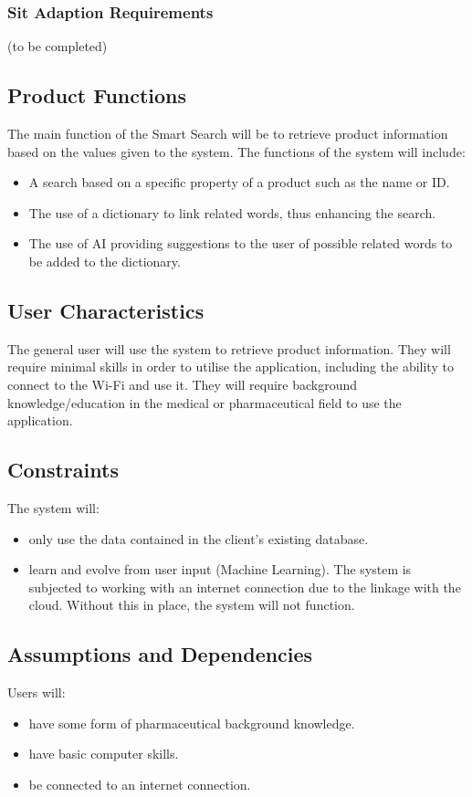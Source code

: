 \documentclass[a4paper,10pt]{article}
\begin{document}
           \subsubsection{Sit Adaption Requirements}
        (to be completed)

		\subsection{Product Functions} {The main function of the Smart Search will be to retrieve product information based on the values given to the system. The functions of the system will include:  }
	\begin{itemize}
  		\item A search based on a specific property of a product such as the name or ID.
		\item The use of a dictionary to link related words, thus enhancing the search.
		\item The use of AI providing suggestions to the user of possible related words to be added to the dictionary.
	\end{itemize}
	
    	\subsection{User Characteristics}  

{The general user will use the system to retrieve product information. They will require minimal skills in order to utilise the application, including the ability to connect to the Wi-Fi and use it. They will require background knowledge/education in the medical or pharmaceutical field to use the application.\\}

    	\subsection{Constraints}
	The system will:
	\begin{itemize}
		\item only use the data contained in the client's existing database.
		\item learn and evolve from user input (Machine Learning).
	The system is subjected to working with an internet connection due to the linkage with the cloud. Without this in place, the system will not function.	
		
	\end{itemize}
	
    	\subsection{Assumptions and Dependencies}
	Users will:	
	\begin{itemize}
	 
		\item have some form of pharmaceutical background knowledge.
		\item have basic computer skills.
		\item be connected to an internet connection.
	\end{itemize}
\end{document}
